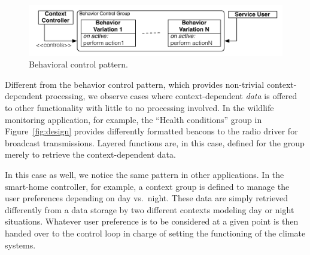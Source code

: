 \begin{figure}[tb]
\begin{center}
\includegraphics[scale=.5]{imgs/beh_var}
\vspace{-4mm}
\caption{Behavioral control pattern.}
  \label{fig:control}
\vspace{-8mm}
\end{center}
\end{figure}




 Different from the behavior control
pattern, which provides non-trivial context-dependent processing, we
observe cases where context-dependent \emph{data} is offered to other
functionality with little to no processing involved. In the wildlife
monitoring application, for example, the ``Health conditions'' group
in Figure~\ref{fig:design} provides differently formatted beacons to
the radio driver for broadcast transmissions. Layered functions are,
in this case, defined for the group merely to retrieve the
context-dependent data.

In this case as well, we notice the same pattern in other
applications. In the smart-home controller, for example, a context
group is defined to manage the user preferences depending on day vs.\
night. These data are simply retrieved differently from a data
storage by two different contexts modeling day or night
situations. Whatever user preference is to be considered at a given
point is then handed over to the control loop in charge of setting the
functioning of the climate systems.

